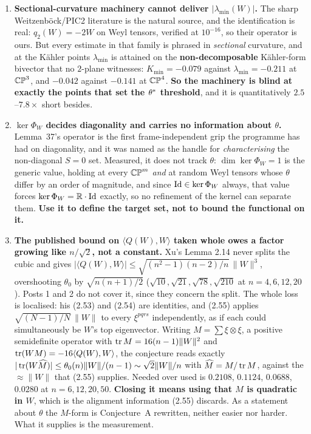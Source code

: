 \begin{enumerate}[leftmargin=1.8em]
\item \textbf{Sectional-curvature machinery cannot deliver $|\lambda_{\min}(W)|$.} The sharp Weitzenb\"ock/PIC2 literature is the natural source, and the identification is real: $q_2(W)=-2W$ on Weyl tensors, verified at $10^{-16}$, so their operator is ours. But every estimate in that family is phrased in \emph{sectional} curvature, and at the K\"ahler points $\lambda_{\min}$ is attained on the \textbf{non-decomposable} K\"ahler-form bivector that no $2$-plane witnesses: $K_{\min}=-0.079$ against $\lambda_{\min}=-0.211$ at $\mathbb{CP}^3$, and $-0.042$ against $-0.141$ at $\mathbb{CP}^4$. \textbf{So the machinery is blind at exactly the points that set the $\theta^{*}$ threshold}, and it is quantitatively $2.5$--$7.8\times$ short besides.

\item \textbf{$\ker\Phi_W$ decides diagonality and carries no information about $\theta$.} Lemma~37's operator is the first frame-independent grip the programme has had on diagonality, and it was named as the handle for \emph{characterising} the non-diagonal $S=0$ set. Measured, it does not track $\theta$: $\dim\ker\Phi_W=1$ is the generic value, holding at every $\mathbb{CP}^m$ \emph{and} at random Weyl tensors whose $\theta$ differ by an order of magnitude, and since $\mathrm{Id}\in\ker\Phi_W$ always, that value forces $\ker\Phi_W=\mathbb{R}\cdot\mathrm{Id}$ exactly, so no refinement of the kernel can separate them. \textbf{Use it to define the target set, not to bound the functional on it.}

\item \textbf{The published bound on $\langle Q(W),W\rangle$ taken whole owes a factor growing like $n/\sqrt2$, not a constant.} Xu's Lemma 2.14 never splits the cubic and gives $|\langle Q(W),W\rangle|\le\sqrt{(n^2-1)(n-2)/n}\,\|W\|^3$, overshooting $\theta_0$ by $\sqrt{n(n+1)/2}$ ($\sqrt{10},\sqrt{21},\sqrt{78},\sqrt{210}$ at $n=4,6,12,20$). Posts 1 and 2 do not cover it, since they concern the split. The whole loss is localised: his (2.53) and (2.54) are identities, and (2.55) applies $\sqrt{(N-1)/N}\,\|W\|$ to every $\xi^{pqrs}$ independently, as if each could simultaneously be $W$'s top eigenvector. Writing $M=\sum\xi\otimes\xi$, a positive semidefinite operator with $\operatorname{tr} M=16(n-1)\|W\|^2$ and $\operatorname{tr}(WM)=-16\langle Q(W),W\rangle$, the conjecture reads exactly $|\operatorname{tr}(W\widehat M)|\le\theta_0(n)\|W\|/(n-1)\sim\sqrt2\|W\|/n$ with $\widehat M=M/\operatorname{tr} M$, against the $\approx\|W\|$ that (2.55) supplies. Needed over used is $0.2108$, $0.1124$, $0.0688$, $0.0280$ at $n=6,12,20,50$. \textbf{Closing it means using that $M$ is quadratic in $W$}, which is the alignment information (2.55) discards. As a statement about $\theta$ the $M$-form is Conjecture~A rewritten, neither easier nor harder. What it supplies is the measurement.


\end{enumerate}
